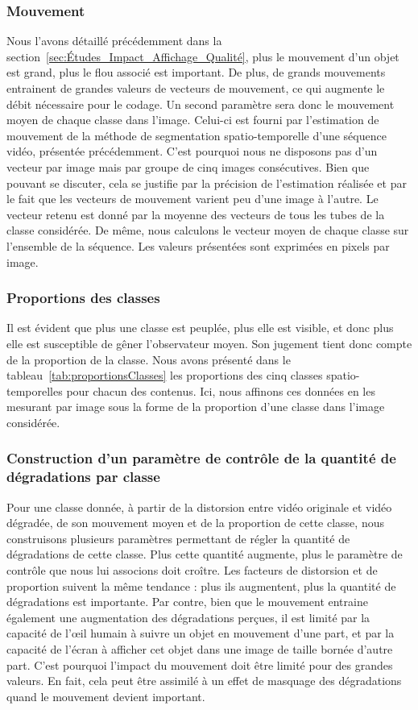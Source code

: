 \subsubsection{Mouvement}
Nous l'avons détaillé précédemment dans la section~\ref{sec:Études_Impact_Affichage_Qualité}, plus le mouvement d'un objet est grand, plus le flou associé est important. De plus, de grands mouvements entrainent de grandes valeurs de vecteurs de mouvement, ce qui augmente le débit nécessaire pour le codage. Un second paramètre sera donc le mouvement moyen de chaque classe dans l'image. Celui-ci est fourni par l'estimation de mouvement de la méthode de segmentation spatio-temporelle d’une séquence vidéo, présentée précédemment. C'est pourquoi nous ne disposons pas d'un vecteur par image mais par groupe de cinq images consécutives. Bien que pouvant se discuter, cela se justifie par la précision de l'estimation réalisée et par le fait que les vecteurs de mouvement varient peu d'une image à l'autre. Le vecteur retenu est donné par la moyenne des vecteurs de tous les tubes de la classe considérée. De même, nous calculons le vecteur moyen de chaque classe sur l'ensemble de la séquence. Les valeurs présentées sont exprimées en pixels par image.


\subsubsection{Proportions des classes}
Il est évident que plus une classe est peuplée, plus elle est visible, et donc plus elle est susceptible de gêner l'observateur moyen. Son jugement tient donc compte de la proportion de la classe. Nous avons présenté dans le tableau~\ref{tab:proportionsClasses} les proportions des cinq classes spatio-temporelles pour chacun des contenus. Ici, nous affinons ces données en les mesurant par image sous la forme de la proportion d'une classe dans l'image considérée.


\subsubsection{Construction d'un paramètre de contrôle de la quantité de dégradations par classe}
Pour une classe donnée, à partir de la distorsion entre vidéo originale et vidéo dégradée, de son mouvement moyen et de la proportion de cette classe, nous construisons plusieurs paramètres permettant de régler la quantité de dégradations de cette classe. Plus cette quantité augmente, plus le paramètre de contrôle que nous lui associons doit croître. Les facteurs de distorsion et de proportion suivent la même tendance : plus ils augmentent, plus la quantité de dégradations est importante. Par contre, bien que le mouvement entraine également une augmentation des dégradations perçues, il est limité par la capacité de l'\oe il humain à suivre un objet en mouvement d'une part, et par la capacité de l'écran à afficher cet objet dans une image de taille bornée d'autre part. C'est pourquoi l'impact du mouvement doit être limité pour des grandes valeurs. En fait, cela peut être assimilé à un effet de masquage des dégradations quand le mouvement devient important.

